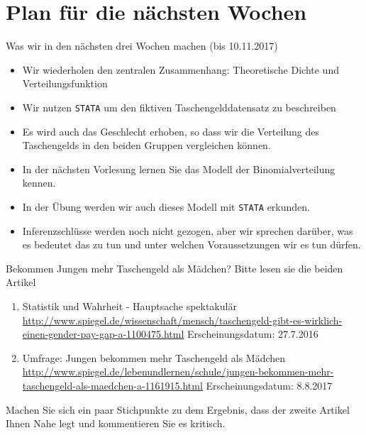 \documentclass[usenames,dvipsnames,handout]{beamer}
\begin{document}
\section{Plan für die nächsten Wochen}
\begin{frame}{Was wir in den nächsten drei Wochen machen (bis 10.11.2017)}
\begin{itemize}
\item{Wir wiederholen den zentralen Zusammenhang: Theoretische Dichte und Verteilungsfunktion}
\item{Wir nutzen \texttt{STATA} um den fiktiven Taschengelddatensatz zu beschreiben}
\item{Es wird auch das Geschlecht erhoben, so dass wir die Verteilung des
Taschengelds in den beiden Gruppen vergleichen können.}
\item{In der nächsten Vorlesung lernen Sie das Modell der Binomialverteilung kennen.}
\item{In der Übung werden wir auch dieses Modell mit \texttt{STATA} erkunden.}
\item{Inferenzschlüsse werden noch nicht gezogen, aber wir sprechen darüber,
was es bedeutet das zu tun und unter welchen Voraussetzungen wir es tun dürfen.

}
\end{itemize}
\end{frame}

\begin{frame}{Bekommen Jungen mehr Taschengeld als Mädchen?}
Bitte lesen sie die beiden Artikel 
\begin{enumerate}
\item{ \colorbox{yellow!20}{Statistik und Wahrheit - Hauptsache spektakulär} \footnotesize{ \url{http://www.spiegel.de/wissenschaft/mensch/taschengeld-gibt-es-wirklich-einen-gender-pay-gap-a-1100475.html} } 
Erscheinungsdatum: 27.7.2016}
\item{ \colorbox{yellow!20}{ Umfrage: Jungen bekommen mehr Taschengeld als Mädchen} \footnotesize{ \url{http://www.spiegel.de/lebenundlernen/schule/jungen-bekommen-mehr-taschengeld-als-maedchen-a-1161915.html} }
Erscheinungsdatum:  8.8.2017}
\end{enumerate}
\colorbox{green!20}{Machen Sie sich ein paar Stichpunkte zu dem Ergebnis, }
\colorbox{green!20}{dass der zweite Artikel Ihnen Nahe legt und kommentieren Sie es kritisch.}
\end{frame}
\end{document}

